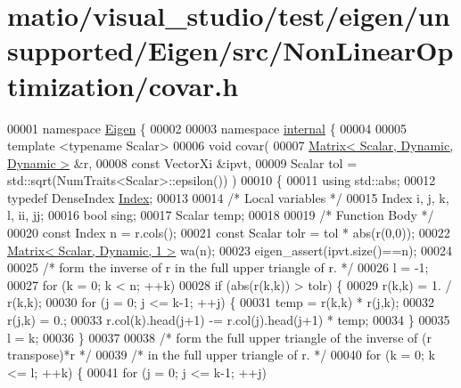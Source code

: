 \hypertarget{matio_2visual__studio_2test_2eigen_2unsupported_2_eigen_2src_2_non_linear_optimization_2covar_8h_source}{}\section{matio/visual\+\_\+studio/test/eigen/unsupported/\+Eigen/src/\+Non\+Linear\+Optimization/covar.h}
\label{matio_2visual__studio_2test_2eigen_2unsupported_2_eigen_2src_2_non_linear_optimization_2covar_8h_source}

\begin{DoxyCode}
00001 \textcolor{keyword}{namespace }\hyperlink{namespace_eigen}{Eigen} \{ 
00002 
00003 \textcolor{keyword}{namespace }\hyperlink{namespaceinternal}{internal} \{
00004 
00005 \textcolor{keyword}{template} <\textcolor{keyword}{typename} Scalar>
00006 \textcolor{keywordtype}{void} covar(
00007         \hyperlink{group___core___module}{Matrix< Scalar, Dynamic, Dynamic >} &r,
00008         \textcolor{keyword}{const} VectorXi &ipvt,
00009         Scalar tol = std::sqrt(NumTraits<Scalar>::epsilon()) )
00010 \{
00011     \textcolor{keyword}{using} std::abs;
00012     \textcolor{keyword}{typedef} DenseIndex \hyperlink{namespace_eigen_a62e77e0933482dafde8fe197d9a2cfde}{Index};
00013 
00014     \textcolor{comment}{/* Local variables */}
00015     Index i, j, k, l, ii, jj;
00016     \textcolor{keywordtype}{bool} sing;
00017     Scalar temp;
00018 
00019     \textcolor{comment}{/* Function Body */}
00020     \textcolor{keyword}{const} Index n = r.cols();
00021     \textcolor{keyword}{const} Scalar tolr = tol * abs(r(0,0));
00022     \hyperlink{group___core___module}{Matrix< Scalar, Dynamic, 1 >} wa(n);
00023     eigen\_assert(ipvt.size()==n);
00024 
00025     \textcolor{comment}{/* form the inverse of r in the full upper triangle of r. */}
00026     l = -1;
00027     \textcolor{keywordflow}{for} (k = 0; k < n; ++k)
00028         \textcolor{keywordflow}{if} (abs(r(k,k)) > tolr) \{
00029             r(k,k) = 1. / r(k,k);
00030             \textcolor{keywordflow}{for} (j = 0; j <= k-1; ++j) \{
00031                 temp = r(k,k) * r(j,k);
00032                 r(j,k) = 0.;
00033                 r.col(k).head(j+1) -= r.col(j).head(j+1) * temp;
00034             \}
00035             l = k;
00036         \}
00037 
00038     \textcolor{comment}{/* form the full upper triangle of the inverse of (r transpose)*r */}
00039     \textcolor{comment}{/* in the full upper triangle of r. */}
00040     \textcolor{keywordflow}{for} (k = 0; k <= l; ++k) \{
00041         \textcolor{keywordflow}{for} (j = 0; j <= k-1; ++j)

\end{DoxyCode}
